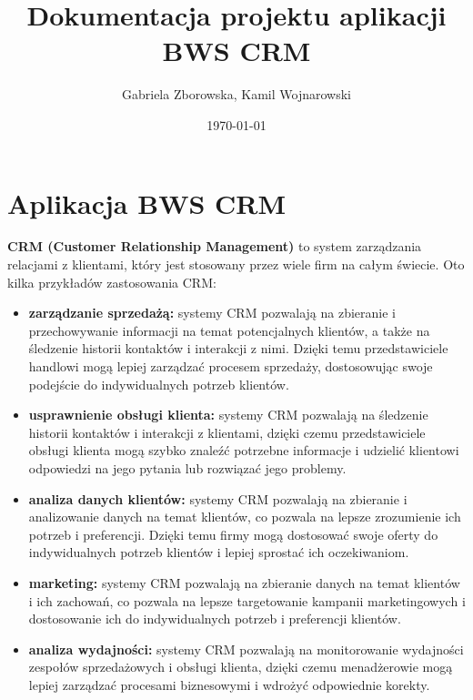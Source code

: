 \documentclass[12pt,a4paper]{article}
\begin{document}
\title{Dokumentacja projektu aplikacji BWS CRM}
\author{Gabriela Zborowska, Kamil Wojnarowski}
\date{\today}

\maketitle

\newpage

\tableofcontents
\listoffigures

\newpage

\section{Aplikacja BWS CRM}

\vspace{12pt}\textbf{CRM (Customer Relationship Management)} to system zarządzania relacjami z klientami, który jest stosowany przez wiele firm na całym świecie. Oto kilka przykładów zastosowania CRM:
\begin{itemize}
    \item\textbf{zarządzanie sprzedażą:} systemy CRM pozwalają na zbieranie i przechowywanie informacji na temat potencjalnych klientów, a także na śledzenie historii kontaktów i interakcji z nimi. Dzięki temu przedstawiciele handlowi mogą lepiej zarządzać procesem sprzedaży, dostosowując swoje podejście do indywidualnych potrzeb klientów.
    \item\textbf{usprawnienie obsługi klienta:} systemy CRM pozwalają na śledzenie historii kontaktów i interakcji z klientami, dzięki czemu przedstawiciele obsługi klienta mogą szybko znaleźć potrzebne informacje i udzielić klientowi odpowiedzi na jego pytania lub rozwiązać jego problemy.
    \item\textbf{analiza danych klientów:} systemy CRM pozwalają na zbieranie i analizowanie danych na temat klientów, co pozwala na lepsze zrozumienie ich potrzeb i preferencji. Dzięki temu firmy mogą dostosować swoje oferty do indywidualnych potrzeb klientów i lepiej sprostać ich oczekiwaniom.
    \item\textbf{marketing:} systemy CRM pozwalają na zbieranie danych na temat klientów i ich zachowań, co pozwala na lepsze targetowanie kampanii marketingowych i dostosowanie ich do indywidualnych potrzeb i preferencji klientów.
    \item\textbf{analiza wydajności:} systemy CRM pozwalają na monitorowanie wydajności zespołów sprzedażowych i obsługi klienta, dzięki czemu menadżerowie mogą lepiej zarządzać procesami biznesowymi i wdrożyć odpowiednie korekty.
\end{itemize}
\end{document}
